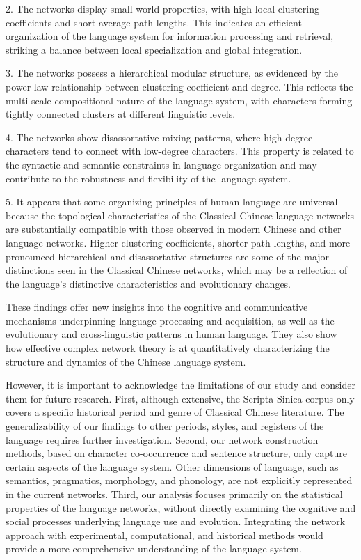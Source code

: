 \documentclass[11pt]{article}
\begin{document}
2. The networks display small-world properties, with high local clustering coefficients and short average path lengths. This indicates an efficient organization of the language system for information processing and retrieval, striking a balance between local specialization and global integration.

3. The networks possess a hierarchical modular structure, as evidenced by the power-law relationship between clustering coefficient and degree. This reflects the multi-scale compositional nature of the language system, with characters forming tightly connected clusters at different linguistic levels.

4. The networks show disassortative mixing patterns, where high-degree characters tend to connect with low-degree characters. This property is related to the syntactic and semantic constraints in language organization and may contribute to the robustness and flexibility of the language system.

5. It appears that some organizing principles of human language are universal because the topological characteristics of the Classical Chinese language networks are substantially compatible with those observed in modern Chinese and other language networks. Higher clustering coefficients, shorter path lengths, and more pronounced hierarchical and disassortative structures are some of the major distinctions seen in the Classical Chinese networks, which may be a reflection of the language's distinctive characteristics and evolutionary changes.

These findings offer new insights into the cognitive and communicative mechanisms underpinning language processing and acquisition, as well as the evolutionary and cross-linguistic patterns in human language. They also show how effective complex network theory is at quantitatively characterizing the structure and dynamics of the Chinese language system.


However, it is important to acknowledge the limitations of our study and consider them for future research. First, although extensive, the Scripta Sinica corpus only covers a specific historical period and genre of Classical Chinese literature. The generalizability of our findings to other periods, styles, and registers of the language requires further investigation. Second, our network construction methods, based on character co-occurrence and sentence structure, only capture certain aspects of the language system. Other dimensions of language, such as semantics, pragmatics, morphology, and phonology, are not explicitly represented in the current networks. Third, our analysis focuses primarily on the statistical properties of the language networks, without directly examining the cognitive and social processes underlying language use and evolution. Integrating the network approach with experimental, computational, and historical methods would provide a more comprehensive understanding of the language system.
\end{document}
